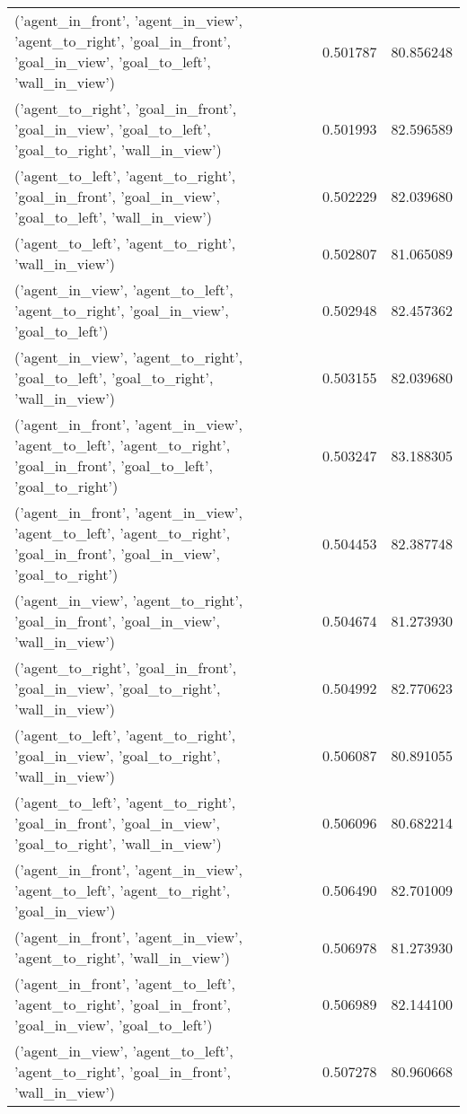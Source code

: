 \begin{tabular}{lrr}
('agent\_in\_front', 'agent\_in\_view', 'agent\_to\_right', 'goal\_in\_front', 'goal\_in\_view', 'goal\_to\_left', 'wall\_in\_view') & 0.501787 & 80.856248 \\
('agent\_to\_right', 'goal\_in\_front', 'goal\_in\_view', 'goal\_to\_left', 'goal\_to\_right', 'wall\_in\_view') & 0.501993 & 82.596589 \\
('agent\_to\_left', 'agent\_to\_right', 'goal\_in\_front', 'goal\_in\_view', 'goal\_to\_left', 'wall\_in\_view') & 0.502229 & 82.039680 \\
('agent\_to\_left', 'agent\_to\_right', 'wall\_in\_view') & 0.502807 & 81.065089 \\
('agent\_in\_view', 'agent\_to\_left', 'agent\_to\_right', 'goal\_in\_view', 'goal\_to\_left') & 0.502948 & 82.457362 \\
('agent\_in\_view', 'agent\_to\_right', 'goal\_to\_left', 'goal\_to\_right', 'wall\_in\_view') & 0.503155 & 82.039680 \\
('agent\_in\_front', 'agent\_in\_view', 'agent\_to\_left', 'agent\_to\_right', 'goal\_in\_front', 'goal\_to\_left', 'goal\_to\_right') & 0.503247 & 83.188305 \\
('agent\_in\_front', 'agent\_in\_view', 'agent\_to\_left', 'agent\_to\_right', 'goal\_in\_front', 'goal\_in\_view', 'goal\_to\_right') & 0.504453 & 82.387748 \\
('agent\_in\_view', 'agent\_to\_right', 'goal\_in\_front', 'goal\_in\_view', 'wall\_in\_view') & 0.504674 & 81.273930 \\
('agent\_to\_right', 'goal\_in\_front', 'goal\_in\_view', 'goal\_to\_right', 'wall\_in\_view') & 0.504992 & 82.770623 \\
('agent\_to\_left', 'agent\_to\_right', 'goal\_in\_view', 'goal\_to\_right', 'wall\_in\_view') & 0.506087 & 80.891055 \\
('agent\_to\_left', 'agent\_to\_right', 'goal\_in\_front', 'goal\_in\_view', 'goal\_to\_right', 'wall\_in\_view') & 0.506096 & 80.682214 \\
('agent\_in\_front', 'agent\_in\_view', 'agent\_to\_left', 'agent\_to\_right', 'goal\_in\_view') & 0.506490 & 82.701009 \\
('agent\_in\_front', 'agent\_in\_view', 'agent\_to\_right', 'wall\_in\_view') & 0.506978 & 81.273930 \\
('agent\_in\_front', 'agent\_to\_left', 'agent\_to\_right', 'goal\_in\_front', 'goal\_in\_view', 'goal\_to\_left') & 0.506989 & 82.144100 \\
('agent\_in\_view', 'agent\_to\_left', 'agent\_to\_right', 'goal\_in\_front', 'wall\_in\_view') & 0.507278 & 80.960668 \\

\end{tabular}
